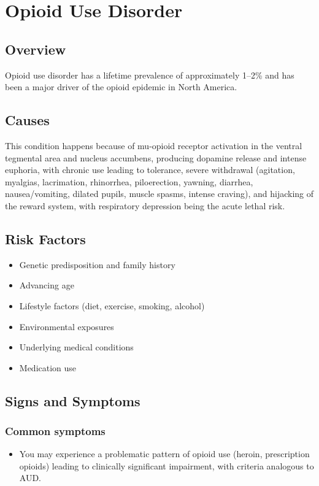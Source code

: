 \chapter{Opioid Use Disorder}
\label{sec:Opioid Use Disorder}

\section{Overview}
Opioid use disorder has a lifetime prevalence of approximately 1--2\% and has been a major driver of the opioid epidemic in North America.
\section{Causes}
This condition happens because of mu-opioid receptor activation in the ventral tegmental area and nucleus accumbens, producing dopamine release and intense euphoria, with chronic use leading to tolerance, severe withdrawal (agitation, myalgias, lacrimation, rhinorrhea, piloerection, yawning, diarrhea, nausea/vomiting, dilated pupils, muscle spasms, intense craving), and hijacking of the reward system, with respiratory depression being the acute lethal risk.     
\section{Risk Factors}

\begin{itemize}[noitemsep]
  \item Genetic predisposition and family history
  \item Advancing age
  \item Lifestyle factors (diet, exercise, smoking, alcohol)
  \item Environmental exposures
  \item Underlying medical conditions
  \item Medication use
\end{itemize}
\section{Signs and Symptoms}

\subsection{Common symptoms}
\begin{itemize}[noitemsep]
  \item You may experience a problematic pattern of opioid use (heroin, prescription opioids) leading to clinically significant impairment, with criteria analogous to AUD. 
  \end{itemize}

